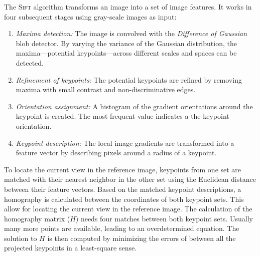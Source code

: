 \documentclass[11pt]{report}
\begin{document}
The \textsc{Sift} algorithm transforms an image into a set of image
features. It works in four subsequent stages using gray-scale images
as input:
\begin{enumerate}
\item \emph{Maxima detection:} The image is convolved with the
  \emph{Difference of Gaussian} blob detector. By varying the variance
  of the Gaussian distribution, the maxima---potential
  keypoints---across different scales and spaces can be detected.
\item \emph{Refinement of keypoints:} The potential keypoints are
  refined by removing maxima with small contrast and non-discriminative
  edges.
\item \emph{Orientation assignment:} A histogram of the gradient
  orientations around the keypoint is created. The most frequent value
  indicates a the keypoint orientation.
\item \emph{Keypoint description:} The local image gradients are
  transformed into a feature vector by describing pixels around a
  radius of a keypoint.
\end{enumerate}

To locate the current view in the reference image, keypoints from one
set are matched with their nearest neighbor in the other set using the
Euclidean distance between their feature vectors. Based on the matched
keypoint descriptions, a homography is calculated between the
coordinates of both keypoint sets. This allow for locating the current
view in the reference image. The calculation of the homography matrix
($H$) needs four matches between both keypoint sets. Usually many more
points are available, leading to an overdetermined equation. The
solution to $H$ is then computed by minimizing the errors of between
all the projected keypoints in a least-square sense.
\end{document}
